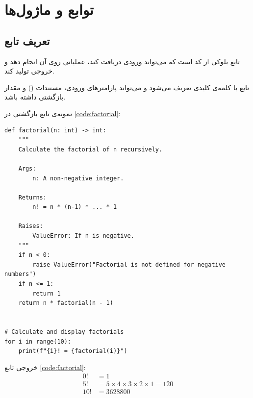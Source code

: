 \documentclass{matinbook}
\begin{document}
\chapter{توابع و ماژول‌ها}
\label{chap:functions}

\section{تعریف تابع}
\label{sec:functions-definition}

تابع بلوکی از کد است که می‌تواند ورودی
دریافت کند، عملیاتی روی آن انجام دهد و خروجی تولید
کند.

\begin{definition}
    تابع با کلمه‌ی کلیدی  تعریف می‌شود
    و می‌تواند پارامترهای ورودی، مستندات
    () و مقدار بازگشتی داشته باشد.
    \label{def:function}
\end{definition}

نمونه‌ی تابع بازگشتی در \cref{code:factorial}:

\begin{latin}
\begin{verbatim}
def factorial(n: int) -> int:
    """
    Calculate the factorial of n recursively.

    Args:
        n: A non-negative integer.

    Returns:
        n! = n * (n-1) * ... * 1

    Raises:
        ValueError: If n is negative.
    """
    if n < 0:
        raise ValueError("Factorial is not defined for negative numbers")
    if n <= 1:
        return 1
    return n * factorial(n - 1)


# Calculate and display factorials
for i in range(10):
    print(f"{i}! = {factorial(i)}")
\end{verbatim}
\end{latin}
\label{code:factorial}

\begin{example}
    خروجی تابع \cref{code:factorial}:
    \begin{align*}
        0! &= 1 \\
        5! &= 5 \times 4 \times 3 \times 2 \times 1 = 120 \\
        10! &= 3628800
    \end{align*}
    \label{ex:factorial-values}
\end{example}
\end{document}
